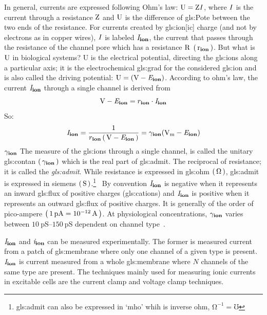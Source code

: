 \documentclass[class={myRUCProject}, crop=false]{standalone}
\begin{document}
In general, currents are expressed following Ohm's law: \(\mathrm{U}=\mathrm{Z}\mathit{I}\), where \(\mathit{I}\) is the current through a resistance \(\mathrm{Z}\) and \(\mathrm{U}\) is the difference of \gls{gls:Pote} between the two ends of the resistance. 
For currents created by \gls{gls:ion}[ic] charge (and not by electrons as in copper wires), \(\mathit{I}\) is labeled \(\mathit{I}_\mathbf{ion}\), the current that passes through the resistance of the channel pore which has a resistance \(\mathrm{R}\) \(\left(\,\mathrm{r}_\mathbf{ion}\,\right)\). 
%
But what is \(\mathrm{U}\) in biological systems? 
%
\unit{U} is the electrical potential, directing the \glspl{gls:ion} along a particular axis; it is the electrochemical \gls{gls:grad} for the considered \gls{gls:ion} and is also called the driving potential: \(\rmm{U}=(\unit{\V} - \equi\ion)\). According to ohm's law, the current \(\mathit{I}_\mathbf{ion}\) through a single channel is derived from 
\begin{equation}
  \unit{\V} - \equi\ion = r\ion \cdot \curr\ion
\end{equation}
So:
\begin{equation}\label{eq:cur2con}
  \curr\ion= \frac{1}{r\ion\br{\unit{\V} - \equi\ion}} = \ucon\ion(\unit{\V\membrane} - \equi\ion)
\end{equation}
\(\gamma_\mathbf{ion}\) The measure of the \glspl{gls:ion} through a single channel, is called the unitary \gls{gls:contan} \(\left(\,\gamma_\mathbf{ion}\,\right)\) which is the real part of \gls{gls:admit}. 
The reciprocal of resistance; it is called the \textit{\gls{gls:admit}}.
While resistance is expressed in \gls{gls:ohm} \(\br{\unit{\ohm}}\), \gls{gls:admit} is expressed in siemens \(\br{\unit{\siemens}}\).\footnote{\Gls{gls:admit} can also be expressed in `mho' whih is inverse ohm, \(\unit{\ohm}^{-1} = \unit{\mho}\)}~
By convention \(\mathit{I}_\mathbf{ion}\) is negative when it represents an inward \gls{gls:flux} of positive charges (\glspl{gls:cation}) and \(\mathit{I}_\mathbf{ion}\) is positive when it represents an outward \gls{gls:flux} of positive charges. It is generally of the order of pico-ampere \(\br{\qty{1}{\pico\ampere}=\qty{e-12}{\ampere}}\). At physiological concentrations, \(\gamma_\mathbf{ion}\) varies between \(\qtyrange{10}{150}{\pico\siemens}\) dependent on channel type~\cite{Hammond2015ch4}.

\(\mathit{I}_\mathbf{ion}\) and \(\mathit{i}_\mathbf{ion}\) can be measured experimentally. The former is measured current from a patch of \gls{gls:membrane} where only one channel of a given type is present. \(\mathit{I}_\mathbf{ion}\) is current measured from a whole \gls{gls:membrane} where \(N\) channels of the same type are present. The techniques mainly used for measuring ionic currents in excitable cells are the current clamp and voltage clamp techniques.
\end{document}
